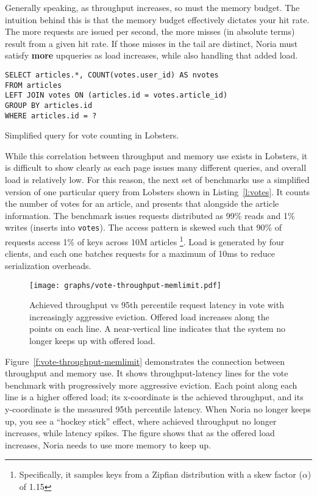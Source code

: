 Generally speaking, as throughput increases, so must the memory budget. The
intuition behind this is that the memory budget effectively dictates your hit
rate. The more requests are issued per second, the more misses (in absolute
terms) result from a given hit rate. If those misses in the tail are
distinct, Noria must satisfy \textbf{more} upqueries as load increases, while
also handling that added load.

\begin{listing}[h]
  \begin{verbatim}
SELECT articles.*, COUNT(votes.user_id) AS nvotes
FROM articles
LEFT JOIN votes ON (articles.id = votes.article_id)
GROUP BY articles.id
WHERE articles.id = ?
  \end{verbatim}
  \caption{Simplified query for vote counting in Lobsters.}
  \label{l:votes}
\end{listing}

While this correlation between throughput and memory use exists in Lobsters, it
is difficult to show clearly as each page issues many different queries, and
overall load is relatively low. For this reason, the next set of benchmarks use
a simplified version of one particular query from Lobsters shown in
Listing~\vref{l:votes}. It counts the number of votes for an article, and
presents that alongside the article information. The benchmark issues requests
distributed as 99\% reads and 1\% writes (inserts into \texttt{votes}). The
access pattern is skewed such that 90\% of requests access 1\% of keys across
10M articles%
\footnote{Specifically, it samples keys from a Zipfian distribution with a skew
factor ($\alpha$) of 1.15}. Load is generated by four clients, and each one
batches requests for a maximum of 10ms to reduce serialization overheads.

\begin{figure}[h]
  \centering
  \texttt{[image: graphs/vote-throughput-memlimit.pdf]}
  \caption{Achieved throughput vs 95th percentile request latency in vote with
  increasingly aggressive eviction. Offered load increases along the points on
  each line. A near-vertical line indicates that the system no longer keeps up
  with offered load.}
  \label{f:vote-throughput-memlimit}
\end{figure}

Figure~\vref{f:vote-throughput-memlimit} demonstrates the connection between
throughput and memory use. It shows throughput-latency lines for the vote
benchmark with progressively more aggressive eviction. Each point along each
line is a higher offered load; its x-coordinate is the achieved throughput, and
its y-coordinate is the measured 95th percentile latency. When Noria no longer
keeps up, you see a ``hockey stick'' effect, where achieved throughput no longer
increases, while latency spikes. The figure shows that as the offered load
increases, Noria needs to use more memory to keep up.

